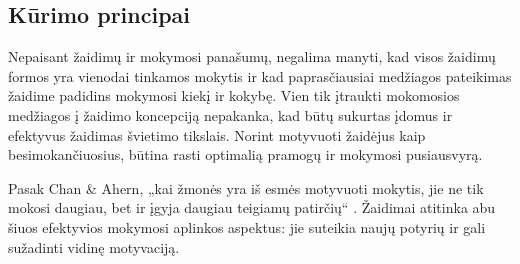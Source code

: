 \documentclass{VUMIFPSkursinis}
\begin{document}
\subsection{Kūrimo principai}
Nepaisant žaidimų ir mokymosi panašumų, negalima manyti, kad visos žaidimų formos yra vienodai tinkamos mokytis ir kad paprasčiausiai medžiagos pateikimas žaidime padidins mokymosi kiekį ir kokybę. Vien tik įtraukti mokomosios medžiagos į žaidimo koncepciją nepakanka, kad būtų sukurtas įdomus ir efektyvus žaidimas švietimo tikslais. Norint motyvuoti žaidėjus kaip besimokančiuosius, būtina rasti optimalią pramogų ir mokymosi pusiausvyrą.\cite{breuer2010so}

Pasak Chan & Ahern, „kai žmonės yra iš esmės motyvuoti mokytis, jie ne tik mokosi daugiau, bet ir įgyja daugiau teigiamų patirčių“ \cite{chan1999targeting}. Žaidimai atitinka abu šiuos efektyvios mokymosi aplinkos aspektus: jie suteikia naujų potyrių ir gali sužadinti vidinę motyvaciją. \cite{paras2005game}
\end{document}
